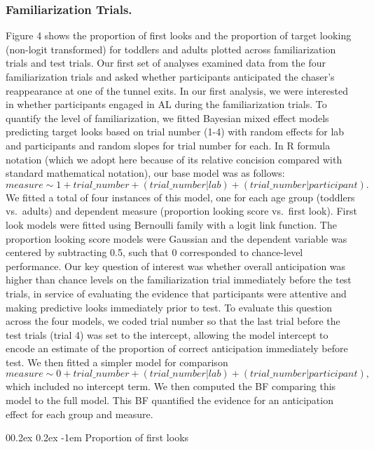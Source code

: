\documentclass[
  man,floatsintext]{apa6}
\makeatletter
\let\oldparagraph\paragraph
\renewcommand{\paragraph}{
    \@ifstar
      \xxxParagraphStar
      \xxxParagraphNoStar
  }
\newcommand{\xxxParagraphStar}[1]{\oldparagraph*{#1}\mbox{}}
\newcommand{\xxxParagraphNoStar}[1]{\oldparagraph{#1}\mbox{}}
\renewcommand{\paragraph}{\@startsection{paragraph}{4}{\parindent}%
  {0\baselineskip \@plus 0.2ex \@minus 0.2ex}%
  {-1em}%
  {\normalfont\normalsize\bfseries\itshape\typesectitle}}
\makeatother
\begin{document}
\subsubsection{Familiarization Trials.}\label{familiarization-trials.}

Figure 4 shows the proportion of first looks and the proportion of target looking (non-logit transformed) for toddlers and adults plotted across familiarization trials and test trials. Our first set of analyses examined data from the four familiarization trials and asked whether participants anticipated the chaser's reappearance at one of the tunnel exits. In our first analysis, we were interested in whether participants engaged in AL during the familiarization trials. To quantify the level of familiarization, we fitted Bayesian mixed effect models predicting target looks based on trial number (1-4) with random effects for lab and participants and random slopes for trial number for each.
In R formula notation (which we adopt here because of its relative concision compared with standard mathematical notation), our base model was as follows:
\(measure \sim 1 + trial\_number +  (trial\_number | lab) + (trial\_number | participant).\)
We fitted a total of four instances of this model, one for each age group (toddlers vs.~adults) and dependent measure (proportion looking score vs.~first look). First look models were fitted using Bernoulli family with a logit link function. The proportion looking score models were Gaussian and the dependent variable was centered by subtracting 0.5, such that 0 corresponded to chance-level performance.
Our key question of interest was whether overall anticipation was higher than chance levels on the familiarization trial immediately before the test trials, in service of evaluating the evidence that participants were attentive and making predictive looks immediately prior to test. To evaluate this question across the four models, we coded trial number so that the last trial before the test trials (trial 4) was set to the intercept, allowing the model intercept to encode an estimate of the proportion of correct anticipation immediately before test. We then fitted a simpler model for comparison
\(measure \sim 0 + trial\_number +  (trial\_number | lab) + (trial\_number | participant),\)
which included no intercept term. We then computed the BF comparing this model to the full model. This BF quantified the evidence for an anticipation effect for each group and measure.

\paragraph{Proportion of first looks}\label{proportion-of-first-looks}
\end{document}
